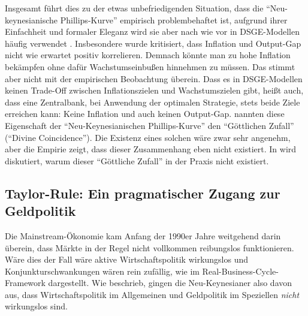 Insgesamt führt dies zu der etwas unbefriedigenden Situation, dass die "`Neu-keynesianische Phillips-Kurve"' empirisch problembehaftet ist, aufgrund ihrer Einfachheit und formaler Eleganz wird sie aber nach wie vor in DSGE-Modellen häufig verwendet \parencite[S. 341]{Romer2019}. Insbesondere wurde kritisiert, dass Inflation und Output-Gap nicht wie erwartet positiv korrelieren. Demnach könnte man zu hohe Inflation bekämpfen ohne dafür Wachstumseinbußen hinnehmen zu müssen. Das stimmt aber nicht mit der empirischen Beobachtung überein. Dass es in DSGE-Modellen keinen Trade-Off zwischen Inflationszielen und Wachstumszielen gibt, heißt auch, dass eine Zentralbank, bei Anwendung der optimalen Strategie, stets beide Ziele erreichen kann: Keine Inflation und auch keinen Output-Gap. \textcite{Blanchard2005} nannten diese Eigenschaft der "`Neu-Keynesianischen Phillips-Kurve"' den "`Göttlichen Zufall"' ("`Divine Coincidence"'). Die Existenz eines solchen wäre zwar sehr angenehm, aber die Empirie zeigt, dass dieser Zusammenhang eben nicht existiert. In \textcite{Gali1999, Gali2015, Blanchard2005} wird diskutiert, warum dieser "`Göttliche Zufall"' in der Praxis nicht existiert.


\subsection{Taylor-Rule: Ein pragmatischer Zugang zur Geldpolitik}
\label{Taylor}
Die Mainstream-Ökonomie kam Anfang der 1990er Jahre weitgehend darin überein, dass Märkte in der Regel nicht vollkommen reibungslos funktionieren. Wäre dies der Fall wäre aktive Wirtschaftspolitik wirkungslos und Konjunkturschwankungen wären rein zufällig, wie im Real-Business-Cycle-Framework dargestellt. Wie \textcite[S. 823]{Akerlof1985} beschrieb, gingen die Neu-Keynesianer also davon aus, dass Wirtschaftspolitik im Allgemeinen und Geldpolitik im Speziellen \textit{nicht} wirkungslos sind.

